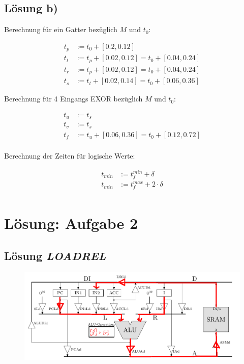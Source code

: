 \documentclass{scrartcl}[9pt, a4paper]
\begin{document}
\subsection*{Lösung b)}

Berechnung für ein Gatter bezüglich $M$ und $t_0$:

\begin{align*}
	t_p & := t_0 + [0.2, 0.12]                       \\
	t_t & := t_p + [0.02, 0.12] = t_0 + [0.04, 0.24] \\
	t_r & := t_p + [0.02, 0.12] = t_0 + [0.04, 0.24] \\
	t_s & := t_t + [0.02, 0.14] = t_0 + [0.06, 0.36]
\end{align*}

Berechnung für 4 Eingangs EXOR bezüglich $M$ und $t_0$:

\begin{align*}
	t_u & := t_s                                     \\
	t_v & := t_s                                     \\
	t_f & := t_u + [0.06, 0.36] = t_0 + [0.12, 0.72] \\
\end{align*}

Berechnung der Zeiten für logische Werte:

\begin{align*}
	t_{min} & := t_f^{min} + \delta         \\
	t_{min} & := t_f^{max} + 2 \cdot \delta \\
\end{align*}


\section*{Lösung: Aufgabe 2}

\subsection*{Lösung \emph{LOADREL}}

\begin{figure}[h]
	\centering
	\includegraphics[width=.8\textwidth]{figs/retil1}
\end{figure}
\end{document}
